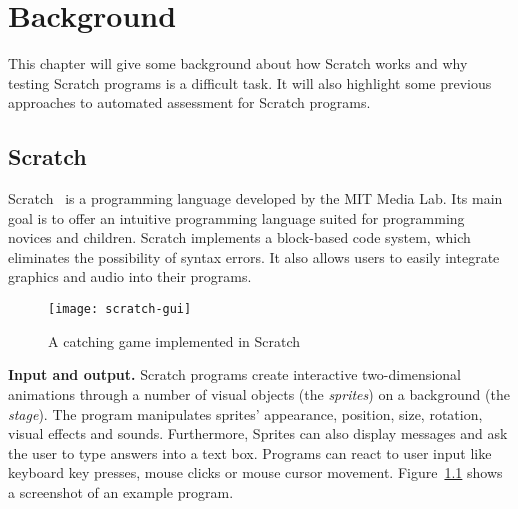 
\chapter{Background}%
\label{cha:background}

This chapter will give some background about how Scratch works and why testing Scratch programs is a difficult task.
It will also highlight some previous approaches to automated assessment for Scratch programs.

\section{Scratch}%
\label{sec:scratch}


Scratch~\cite{scratch} is a programming language developed by the MIT Media Lab.
Its main goal is to offer an intuitive programming language suited for programming novices and children.
Scratch implements a block-based code system, which eliminates the possibility of syntax errors.
It also allows users to easily integrate graphics and audio into their programs.
\parspace

\begin{figure}[h]
    \centering
    \texttt{[image: scratch-gui]}
    \caption{A catching game implemented in Scratch}
    \label{fig:scratch-gui}
\end{figure}

\textbf{Input and output.}
Scratch programs create interactive two-dimensional animations through a number of visual objects (the \textit{sprites}) on a background (the \textit{stage}).
The program manipulates sprites' appearance, position, size, rotation, visual effects and sounds.
Furthermore, Sprites can also display messages and ask the user to type answers into a text box.
Programs can react to user input like keyboard key presses, mouse clicks or mouse cursor movement.
Figure~\ref{fig:scratch-gui} shows a screenshot of an example program.
\parspace


